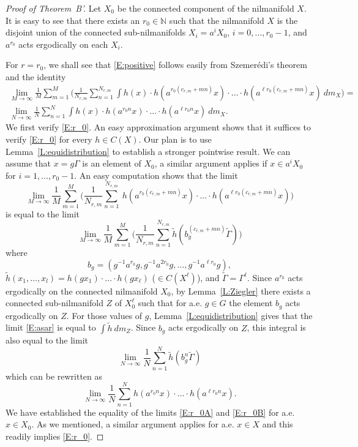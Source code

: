 \documentclass[11pt]{amsart}
\newcommand{\N}{\mathbb{N}}
\theoremstyle{plain}
\theoremstyle{definition}
\theoremstyle{remark}
\begin{document}
\begin{proof}[Proof of Theorem~B']
 Let $X_0$ be the connected component of the nilmanifold $X$. It is easy to see that   there exists an $r_0\in \N$ such that the nilmanifold $X$ is the disjoint union of the connected sub-nilmanifolds $X_i=a^iX_0$, $i=0,\ldots,r_0-1$, and $a^{r_0}$ acts ergodically on each $X_i$.

 For $r=r_0$,  we shall see that  \eqref{E:positive}  follows easily from Szemer\'edi's theorem and the identity
\begin{multline}\label{E:r_0}
\lim_{M\to\infty}\frac{1}{M}\sum_{m=1}^M\Big(\frac{1}{N_{r,m}}\sum_{n=1}^{N_{r,m}}   \int h(x) \cdot h(a^{r_0(c_{r,m}+mn)}x)
    \cdot\ldots\cdot h(a^{\ell r_0(c_{r,m}+mn)}x) \  dm_X \Big)=\\
\lim_{N\to\infty}  \frac{1}{N}\sum_{n=1}^N  \int h(x) \cdot h(a^{r_0 n}x)
    \cdot\ldots\cdot h(a^{\ell r_0 n}x) \ dm_X.
  \end{multline}
We first verify \eqref{E:r_0}.   An easy approximation argument shows that  it suffices to  verify \eqref{E:r_0} for every $h\in C(X)$.
  Our plan is to use Lemma~\ref{L:equidistribution} to establish a stronger pointwise result.
We can assume that  $x=g\Gamma$ is an element of $X_0$, a similar argument applies if $x\in a^i X_0$ for
$i=1,\ldots,r_0-1$. An easy computation shows that the limit
\begin{equation} \label{E:r_0A}
\lim_{M\to\infty}\frac{1}{M}\sum_{m=1}^M\Big(\frac{1}{N_{r,m}}\sum_{n=1}^{N_{r,m}}   \ h(a^{r_0(c_{r,m}+mn)}x)
    \cdot\ldots\cdot h(a^{\ell r_0(c_{r,m}+mn)}x)\Big)
    \end{equation}
    is equal to the limit
    \begin{equation}\label{E:asar}
   \lim_{M\to\infty} \frac{1}{M}\sum_{m=1}^M\Big(\frac{1}{N_{r,m}}\sum_{n=1}^{N_{r,m}}   \tilde{h}(b^{(c_{r,m}+mn)}_g\tilde{\Gamma})\Big)
    \end{equation}
  where $$
  b_g=(g^{-1}a^{r_0}g,g^{-1}a^{2 r_0}g,\ldots, g^{-1}a^{\ell r_0}g),
   $$
   $\tilde{h}(x_1,\ldots,x_l)=h(gx_1)\cdot \ldots\cdot h(gx_\ell)$ ($\in C(X^\ell)$),
  and $\tilde{\Gamma}=\Gamma^\ell$.
  Since $a^{r_0}$ acts ergodically on the connected nilmanifold $X_0$, by Lemma~\ref{L:Ziegler} there exists a connected sub-nilmanifold $Z$ of $X^\ell_0$ such
  that for a.e. $g\in G$ the element
  $b_g$ acts ergodically on $Z$. For those values of $g$,   Lemma~\ref{L:equidistribution} gives that  the limit  \eqref{E:asar} is equal to $\int \tilde{h} \  dm_Z$. Since $b_g$ acts ergodically on $Z$, this integral is also   equal to the limit
  $$
  \lim_{N\to\infty}\frac{1}{N}\sum_{n=1}^N \tilde{h}(b^n_g\tilde{\Gamma})
$$
which can be rewritten as
  \begin{equation}\label{E:r_0B}
  \lim_{N\to\infty}  \frac{1}{N}\sum_{n=1}^N   h(a^{r_0 n}x)
    \cdot\ldots\cdot h(a^{\ell r_0 n}x).
  \end{equation}
   We have established the equality of the limits
\eqref{E:r_0A} and \eqref{E:r_0B} for a.e. $x\in X_0$. As we
mentioned, a similar argument applies for a.e. $x\in X$ and this
readily implies \eqref{E:r_0}.



\end{proof}
\end{document}
